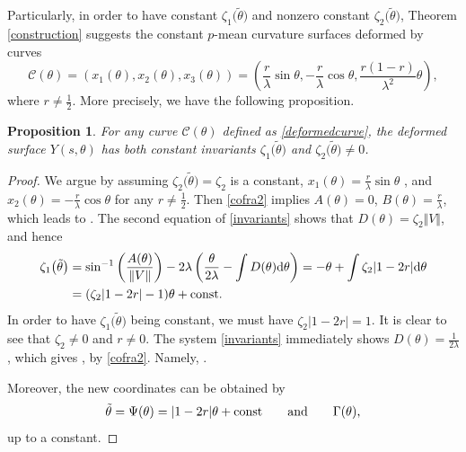 \documentclass[pdftex]{sigma}
\numberwithin{equation}{section}
\newtheorem{Proposition}[Theorem]{Proposition}
\begin{document}
Particularly, in order to have constant $\zeta_1\bigl(\tilde \theta\bigr)$ and nonzero
constant $\zeta_2\bigl(\tilde \theta\bigr)$, Theorem \ref{construction} suggests the
constant $p$-mean curvature surfaces deformed by curves
\begin{equation} \label{deformedcurve}
\mathcal{C}(\theta)=(x_{1}(\theta),x_{2}(\theta),x_{3}(\theta))=\left(\frac{r}{
\lambda}\sin{\theta},-\frac{r}{\lambda}\cos{\theta},\frac{r(1-r)}{\lambda^2}
\theta\right),
\end{equation}
where $r\neq \frac{1}{2}$. More precisely, we have the following proposition.

\begin{Proposition}
\label{c2value} For any curve $\mathcal{C}(\theta)$ defined as
\eqref{deformedcurve}, the deformed surface $Y(s,\theta)$ has both constant
invariants $\zeta_1\bigl(\tilde \theta\bigr)$ and $\zeta_2\bigl(\tilde \theta\bigr)\neq 0$.
\end{Proposition}

\begin{proof}
We argue by assuming $\zeta_2\bigl(\tilde \theta\bigr)=\zeta_2$ is a constant, $
x_{1}(\theta)=\frac{r}{\lambda}\sin{\theta}$ , and $x_{2}(\theta)=-\frac{r}{
\lambda}\cos{\theta}$ for any $r\neq \frac{1}{2}$. Then \eqref{cofra2}
implies $A(\theta)=0$, $B(\theta)=\frac{r}{\lambda}$, which leads to
.
The second equation of \eqref{invariants} shows that $D(\theta)=\zeta_2
\Vert V \Vert $, and hence
\begin{align*}
\zeta_1\bigl(\tilde \theta\bigr)&= \sin^{-1}\left(\frac{A(\theta)}{\Vert V
\Vert }\right)-2\lambda \left(\frac{\theta}{2\lambda}-\int D(\theta) {\rm d}\theta
\right) =-\theta+\int \zeta_2|1-2r|{\rm d}\theta \\
&=(\zeta_2|1-2r|-1)\theta+\text{\rm const}.
\end{align*}
In order to have $\zeta_1\bigl(\tilde \theta\bigr)$ being constant, we must have
$
\zeta_2|1-2r|=1$.
It is clear to see that $\zeta_2\neq 0$ and $r\neq 0$. The system
\eqref{invariants} immediately shows $D(\theta)=\frac{1}{2\lambda}$, which
gives
,
by \eqref{cofra2}. Namely, .

Moreover, the new coordinates can be obtained by
\[
\tilde \theta=\Psi(\theta)=|1-2r|\theta+\text{\rm const}\qquad \text{and} \qquad
\Gamma(\theta),\]
up to a constant.
\end{proof}
\end{document}
